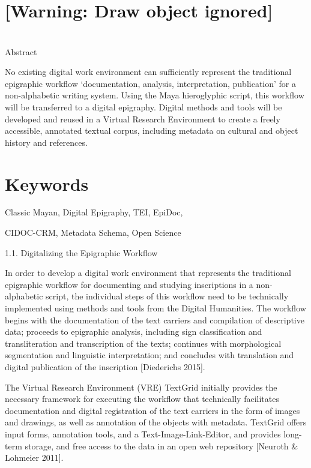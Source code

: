 \documentclass[amsthm,ebook]{saparticle}
\title{}
\author{Diederichs}
\date{2015-11-17}
\begin{document}
\clearpage\setcounter{page}{1}\section[]{[Warning: Draw object ignored]}
\section{}
Abstract


\bigskip

No existing digital work environment can sufficiently represent the traditional epigraphic workflow ‘documentation,
analysis, interpretation, publication’ for a non-alphabetic writing system. Using the Maya hieroglyphic script, this
workflow will be transferred to a digital epigraphy. Digital methods and tools will be developed and reused in a
Virtual Research Environment to create a freely accessible, annotated textual corpus, including metadata on cultural
and object history and references. 

\section[Keywords]{Keywords}
Classic Mayan, Digital Epigraphy, TEI, EpiDoc, 

CIDOC-CRM, Metadata Schema, Open Science


\bigskip


\bigskip

1.1. Digitalizing the Epigraphic Workflow 

In order to develop a digital work environment that represents the traditional epigraphic workflow for documenting and
studying inscriptions in a non-alphabetic script, the individual steps of this workflow need to be technically
implemented using methods and tools from the Digital Humanities. The workflow begins with the documentation of the text
carriers and compilation of descriptive data; proceeds to epigraphic analysis, including sign classification and
transliteration and transcription of the texts; continues with morphological segmentation and linguistic
interpretation; and concludes with translation and digital publication of the inscription [Diederichs 2015]. 

The Virtual Research Environment (VRE) TextGrid initially provides the necessary framework for executing the workflow
that technically facilitates documentation and digital registration of the text carriers in the form of images and
drawings, as well as annotation of the objects with metadata. TextGrid offers input forms, annotation tools, and a
Text-Image-Link-Editor, and provides long-term storage, and free access to the data in an open web repository [Neuroth
\& Lohmeier 2011]. 
\end{document}
